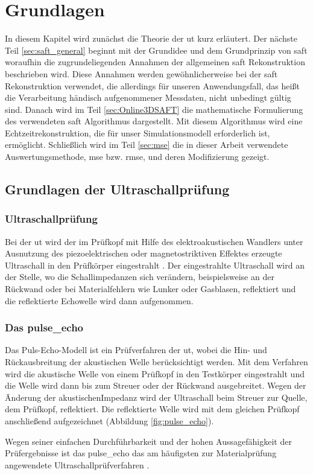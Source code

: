 \chapter{Grundlagen} \label{chap:basic_ut_saft}

In diesem Kapitel wird zunächst die Theorie der \acrfull{ut} kurz erläutert. Der nächste Teil \ref{sec:saft_general} beginnt mit der Grundidee und dem Grundprinzip von \acrshort{saft} woraufhin die zugrundeliegenden Annahmen der allgemeinen \acrshort{saft} Rekonstruktion beschrieben wird. Diese Annahmen werden gewöhnlicherweise bei der \acrshort{saft} Rekonstruktion verwendet, die allerdings für unseren Anwendungsfall, das heißt die Verarbeitung händisch aufgenommener Messdaten, nicht unbedingt gültig sind. Danach wird im Teil \ref{sec:Online3DSAFT} die mathematische Formulierung des verwendeten \acrshort{saft} Algorithmus dargestellt. Mit diesem Algorithmus wird eine Echtzeitrekonstruktion, die für unser Simulationsmodell erforderlich ist, ermöglicht. Schließlich wird im Teil \ref{sec:mse} die in dieser Arbeit verwendete Auswertungsmethode, \acrfull{mse} bzw. \acrfull{rmse}, und deren Modifizierung gezeigt.  
 

\section{Grundlagen der Ultraschallprüfung} 
\subsection{Ultraschallprüfung}
Bei der \acrshort{ut} wird der im Prüfkopf mit Hilfe des elektroakustischen Wandlers unter Ausnutzung des piezoelektrischen oder magnetostriktiven Effektes erzeugte Ultraschall in den Prüfkörper eingestrahlt \cite{WSPraktikumUS1}. Der eingestrahlte Ultraschall wird an der Stelle, wo die Schallimpedanzen sich verändern, beispielsweise an der Rückwand oder bei Materialfehlern wie Lunker oder Gasblasen, reflektiert und die reflektierte Echowelle wird dann aufgenommen. \par


\subsection{Das \gls{pulse_echo}} \label{sec:pulse_echo}
Das Puls-Echo-Modell ist ein Prüfverfahren der \acrshort{ut}, wobei die Hin- und Rückausbreitung der akustischen Welle berücksichtigt werden. Mit dem Verfahren wird die akustische Welle von einem Prüfkopf in den Testkörper eingestrahlt und die Welle wird dann bis zum Streuer oder der Rückwand ausgebreitet. Wegen der Änderung der akustischenImpedanz wird der Ultraschall beim Streuer zur Quelle, dem Prüfkopf, reflektiert. Die reflektierte Welle wird mit dem gleichen Prüfkopf anschließend aufgezeichnet (Abbildung \ref{fig:pulse_echo}).\par
Wegen seiner einfachen Durchführbarkeit und der hohen Aussagefähigkeit der Prüfergebnisse ist das \gls{pulse_echo} das am häufigsten zur Materialprüfung angewendete Ultraschallprüfverfahren \cite{WSPraktikumUS1}. \par

